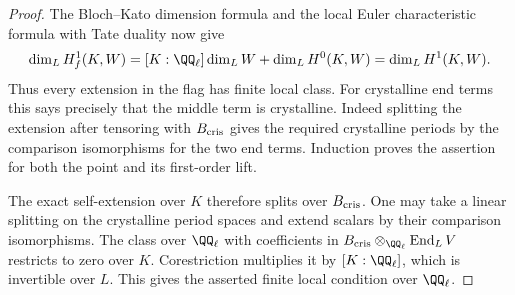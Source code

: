 \documentclass[a4paper,11pt]{article}
\theoremstyle{definition}
\theoremstyle{remark}
\numberwithin{equation}{section}
\begin{document}
\begin{proof}
The Bloch--Kato dimension formula and the local Euler
characteristic formula with Tate duality now give
\[
 \dim_L H^1_f(K,W)
   =[K:\QQ_\ell]\dim_L W+\dim_L H^0(K,W)
   =\dim_L H^1(K,W).
\]
Thus every extension in the flag has finite local class.
For crystalline end terms this says precisely that the middle
term is crystalline. Indeed splitting the extension after
tensoring with \(B_{\rm cris}\) gives the required crystalline
periods by the comparison isomorphisms for the two end terms.
Induction proves the assertion for both the point and its
first-order lift.~\cite{IX-VII-VI-bk117,IX-VII-V-milne98}

The exact self-extension over \(K\) therefore splits over
\(B_{\rm cris}\). One may take a linear splitting on the
crystalline period spaces and extend scalars by their comparison
isomorphisms. The class over \(\QQ_\ell\) with coefficients in
\(B_{\rm cris}\otimes_{\QQ_\ell}\operatorname{End}_L V\)
restricts to zero over \(K\). Corestriction multiplies it by
\([K:\QQ_\ell]\), which is invertible over \(L\). This gives
the asserted finite local condition over \(\QQ_\ell\).
\end{proof}
\end{document}
